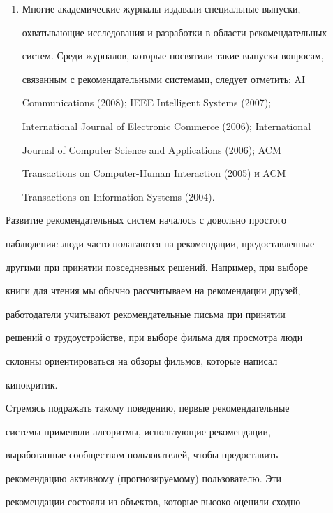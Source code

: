 \begin{enumerate}[1.]
построения рекомендательных систем.


\item Многие академические журналы издавали специальные выпуски,


охватывающие исследования и разработки в области рекомендательных


систем. Среди журналов, которые посвятили такие выпуски вопросам,


связанным с рекомендательными системами, следует отметить: AI


Communications (2008); IEEE Intelligent Systems (2007);


International Journal of Electronic Commerce (2006); International


Journal of Computer Science and Applications (2006); ACM


Transactions on Computer-Human Interaction (2005) и ACM


Transactions on Information Systems (2004).


\end{enumerate}








Развитие рекомендательных систем началось с довольно простого


наблюдения: люди часто полагаются на рекомендации, предоставленные


другими при принятии повседневных решений. Например, при выборе


книги для чтения мы обычно рассчитываем на ре\-ко\-мен\-да\-ции друзей,


работодатели учитывают рекомендательные письма при принятии


решений о трудоустройстве, при выборе филь\-ма для просмотра люди


склонны ориентироваться на обзоры фильмов, ко\-то\-рые написал


кинокритик.





Стремясь подражать такому поведению, первые рекомендательные


системы применяли алгоритмы, использующие рекомендации,


выработанные сообществом пользователей, чтобы предоставить


рекомендацию активному (прогнозируемому) пользователю. Эти


рекомендации состояли из объектов, которые высоко оценили сходно


